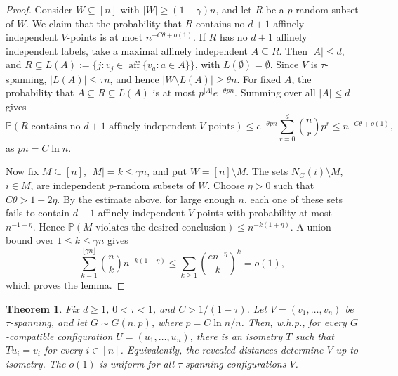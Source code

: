\documentclass[fullpage,11pt]{article}
\newcommand{\PP}{\mathbb{P}}
\providecommand{\aff}{\operatorname{aff}}
\theoremstyle{break}
\newtheorem{theorem}{Theorem}
\theoremstyle{definition}
\theoremstyle{break}
\begin{document}
\begin{proof}
Consider \(W\subseteq[n]\) with \(|W|\ge(1-\gamma)n\), and let \(R\) be a
\(p\)-random subset of \(W\). We claim that the probability that \(R\) contains
no \(d+1\) affinely independent \(V\)-points is at most \(n^{-C\theta+o(1)}\).
If \(R\) has no \(d+1\) affinely independent labels, take a maximal
affinely independent \(A\subseteq R\). Then \(|A|\le d\), and
\(R\subseteq L(A):=\{j:v_j\in\aff\{v_a:a\in A\}\}\), with
\(L(\emptyset)=\emptyset\). Since \(V\) is \(\tau\)-spanning,
\(|L(A)|\le\tau n\), and hence \(|W\setminus L(A)|\ge\theta n\). For fixed
\(A\), the probability that \(A\subseteq R\subseteq L(A)\) is at most
\(p^{|A|}e^{-\theta pn}\). Summing over all \(|A|\le d\) gives
\[
    \PP(R\text{ contains no }d+1\text{ affinely independent }V\text{-points})
    \le e^{-\theta pn}\sum_{r=0}^{d}\binom{n}{r}p^r
    \le n^{-C\theta+o(1)},
\]
as \(pn=C\ln n\).

Now fix \(M\subseteq[n]\), \(|M|=k\le\gamma n\), and put
\(W=[n]\setminus M\). The sets \(N_G(i)\setminus M\), \(i\in M\), are
independent \(p\)-random subsets of \(W\). Choose \(\eta>0\) such that
\(C\theta>1+2\eta\). By the estimate above, for large enough \(n\), each one of
these sets fails to contain \(d+1\) affinely independent \(V\)-points with
probability at most \(n^{-1-\eta}\). Hence
\(\PP(M\text{ violates the desired conclusion})\le n^{-k(1+\eta)}\). A union bound
over \(1\le k\le\gamma n\) gives
\[
\sum_{k=1}^{\lfloor\gamma n\rfloor}
        \binom{n}{k} n^{-k(1+\eta)}
    \le
\sum_{k\ge1}
        \left(\frac{e n^{-\eta}}{k}\right)^k
    =o(1),
\]
which proves the lemma.
\end{proof}

\begin{theorem}\label{thm:random-reconstruction-tau-spanning}
Fix \(d\ge1\), \(0<\tau<1\), and \(C>1/(1-\tau)\). Let
\(V=(v_1,\ldots,v_n)\) be \(\tau\)-spanning, and let \(G\sim G(n,p)\), where
\(p=C\ln n/n\). Then, w.h.p., for every \(G\)-compatible configuration
\(U=(u_1,\ldots,u_n)\), there is an isometry \(T\) such that
\(T u_i=v_i\) for every \(i\in[n]\). Equivalently, the revealed distances
determine \(V\) up to isometry. The \(o(1)\) is uniform for all
\(\tau\)-spanning configurations \(V\).
\end{theorem}
\end{document}
